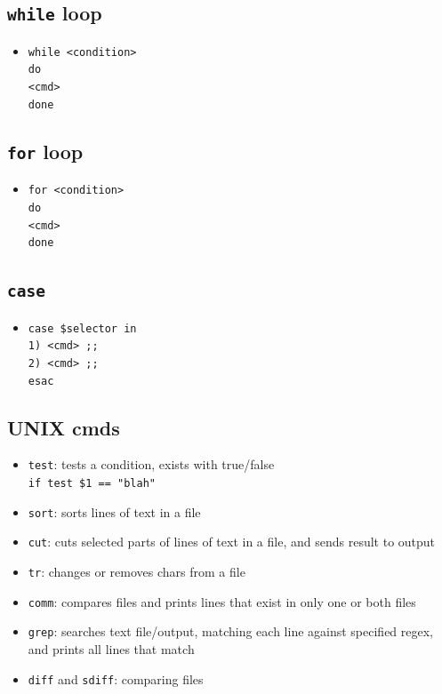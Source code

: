 \documentclass[10pt, multicolumn, a4paper]{article}
\begin{document}
\begin{multicols}{2}
	\subsection*{\texttt{while} loop}
	\begin{itemize}
	\item \texttt{while <condition> \\ do \\ \hspace*{5mm} <cmd> \\ done}
	\end{itemize}
	\subsection*{\texttt{for} loop}
	\begin{itemize}
	\item \texttt{for <condition> \\ do \\ \hspace*{5mm} <cmd> \\ done}
	\end{itemize}
	\subsection*{\texttt{case}}
	\begin{itemize}
	\item \texttt{case \$selector in \\ 1) <cmd> ;; \\ 2) <cmd> ;; \\ esac}
	\end{itemize}
	\subsection*{UNIX cmds}
	\begin{itemize}
	\item \texttt{test}: tests a condition, exists with true/false
		\\ \texttt{if test \$1 == "blah"}
	\item \texttt{sort}: sorts lines of text in a file
	\item \texttt{cut}: cuts selected parts of lines of text in a file, and sends result to output
	\item \texttt{tr}: changes or removes chars from a file
	\item \texttt{comm}: compares files and prints lines that exist in only one or both files
	\item \texttt{grep}: searches text file/output, matching each line against specified regex, and prints all lines that match
	\item \verb|diff| and \verb|sdiff|: comparing files
	\end{itemize}

\end{multicols}
\end{document}
